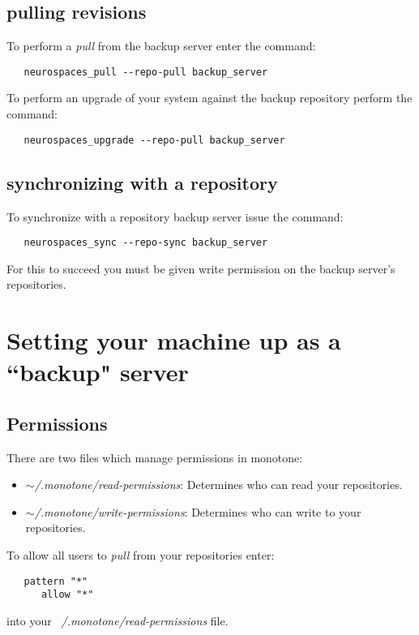 \documentclass[12pt]{article}
\begin{document}
\subsection*{pulling revisions}

To perform a {\it pull} from the backup server enter the command:
\begin{verbatim}
   neurospaces_pull --repo-pull backup_server
\end{verbatim}
To perform an upgrade of your system against the backup repository perform the command:
\begin{verbatim}
   neurospaces_upgrade --repo-pull backup_server
\end{verbatim}

\subsection*{synchronizing with a repository}

To synchronize with a repository backup server issue the command:
\begin{verbatim}
   neurospaces_sync --repo-sync backup_server
\end{verbatim}

For this to succeed you must be given write permission on the backup server's repositories.

\section*{Setting your machine up as a ``backup" server}

\subsection*{Permissions}

There are two files which manage permissions in monotone:
\begin{itemize}
   \item[]{\it $\sim$/.monotone/read-permissions}: Determines who can read your repositories. 
   \item[]{\it $\sim$/.monotone/write-permissions}: Determines who can write to your repositories. 
\end{itemize}
To allow all users to {\it pull} from your repositories enter:
\begin{verbatim}
   pattern "*"  
      allow "*"
\end{verbatim}
into your {\it ~/.monotone/read-permissions} file.
\end{document}

